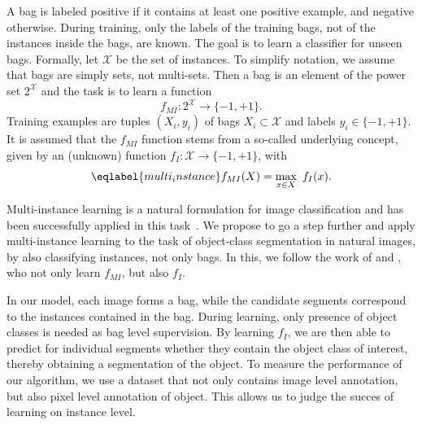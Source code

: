 A bag is labeled positive if it contains at least one positive example, and
negative otherwise.  During training, only the labels of the training bags, not
of the instances inside the bags, are known.  The goal is to learn a classifier
for unseen bags. 
Formally, let $\mathcal{X}$ be the set of instances. To simplify notation, we
assume that bags are simply sets, not multi-sets.  Then a bag is an element of
the power set $2^\mathcal{X}$ and the task is to learn a function
\begin{equation} f_{MI} \colon 2^\mathcal{X} \rightarrow \{-1,+1\}.  \end{equation}
Training examples are tuples $(X_i,y_i)$ of bags $X_i \subset \mathcal{X}$ and
labels $y_i \in \{-1,+1\}$.  It is assumed that the $f_{MI}$ function stems
from a so-called underlying concept, given by an (unknown) function
$f_{I} \colon \mathcal{X} \rightarrow \{-1,+1\}$, with 
\begin{equation}\eqlabel{multi_instance}
f_{MI}(X)= \max_{x \in X}\ f_{I}(x).
\end{equation}

Multi-instance learning is a natural formulation for image classification and
has been successfully applied in this task~\citep{zhou2007multi}. We propose to
go a step further and apply multi-instance learning to the task of object-class
segmentation in natural images, by also classifying instances, not only bags.
In this, we follow the work of \citet{liconvex2010} and \citet{zha2008joint}, who not
only learn $f_{MI}$, but also $f_{I}$.

In our model, each image forms a bag, while the candidate segments correspond
to the instances contained in the bag. During learning, only presence of object
classes is needed as bag level supervision. By learning $f_{I}$, we are then
able to predict for individual segments whether they contain the object class
of interest, thereby obtaining a segmentation of the object.
To measure the performance of our algorithm, we use a dataset that not only contains
image level annotation, but also pixel level annotation of object. This allows
us to judge the succes of learning on instance level.


